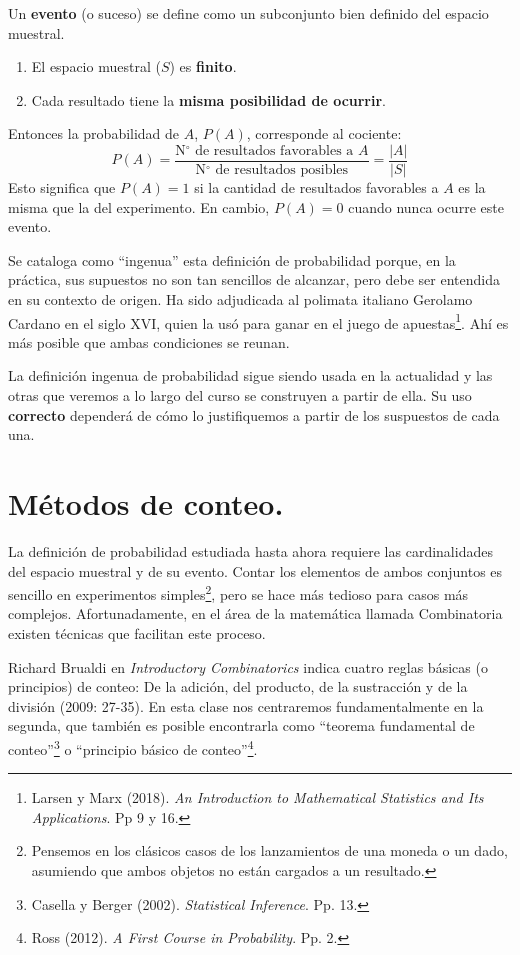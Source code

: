 \documentclass[12pt]{article}
\begin{document}
Un \textbf{evento} (o suceso) se define como un subconjunto bien definido del espacio muestral.

\begin{enumerate}
\item El espacio muestral ($S$) es \textbf{finito}.
\item Cada resultado tiene la \textbf{misma posibilidad de ocurrir}.
\end{enumerate}

Entonces la probabilidad de $A$, $P(A)$, corresponde al cociente:
\[
  P(A) = \frac{\text{N$^{\circ}$ de resultados favorables a } A}{\text{N$^{\circ}$ de resultados posibles}} = \frac{|A|}{|S|}
\]
Esto significa que $P(A) = 1$ si la cantidad de resultados favorables a $A$ es la misma que la del experimento. En cambio, $P(A) = 0$ cuando nunca ocurre este evento.

Se cataloga como ``ingenua'' esta definición de probabilidad porque, en la práctica, sus supuestos no son tan sencillos de alcanzar, pero debe ser entendida en su contexto de origen. Ha sido adjudicada al polimata italiano Gerolamo Cardano en el siglo XVI, quien la usó para ganar en el juego de apuestas\footnote{Larsen y Marx (2018). \textit{An Introduction to Mathematical Statistics and Its Applications}. Pp 9 y 16.}. Ahí es más posible que ambas condiciones se reunan.

La definición ingenua de probabilidad sigue siendo usada en la actualidad y las otras que veremos a lo largo del curso se construyen a partir de ella. Su uso \textbf{correcto} dependerá de cómo lo justifiquemos a partir de los suspuestos de cada una.


\section{Métodos de conteo.}

La definición de probabilidad estudiada hasta ahora requiere las cardinalidades del espacio muestral y de su evento. Contar los elementos de ambos conjuntos es sencillo en experimentos simples\footnote{Pensemos en los clásicos casos de los lanzamientos de una moneda o un dado, asumiendo que ambos objetos no están cargados a un resultado.}, pero se hace más tedioso para casos más complejos. Afortunadamente, en el área de la matemática llamada Combinatoria existen técnicas que facilitan este proceso.

Richard Brualdi en \textit{Introductory Combinatorics} indica cuatro reglas básicas (o principios) de conteo: De la adición, del producto, de la sustracción y de la división (2009: 27-35). En esta clase nos centraremos fundamentalmente en la segunda, que también es posible encontrarla como ``teorema fundamental de conteo''\footnote{Casella y Berger (2002). \textit{Statistical Inference}. Pp. 13.} o ``principio básico de conteo''\footnote{Ross (2012). \textit{A First Course in Probability}. Pp. 2.}.
\end{document}
